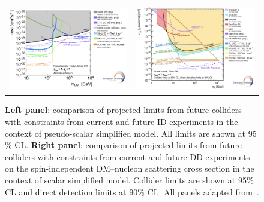\documentclass[11pt]{article}
\begin{document}
\begin{figure}[ht]
\begin{tabular}{ll}
\includegraphics[scale=0.52]{DMsummaryplots_ID.png}
&
\includegraphics[scale=0.49]{DMsummaryplots_DD.png}
\end{tabular}
\caption{{\bf Left panel}: comparison of projected limits from future colliders with constraints from current and future ID experiments in the context of pseudo-scalar simplified model. All limits are shown at 95$\%$ CL. {\bf Right panel}: comparison of projected limits from future colliders with constraints from current and future DD experiments on the spin-independent DM–nucleon scattering cross section in the context of scalar simplified model. Collider limits are shown at 95$\%$ CL and direct detection limits at 90$\%$ CL. All panels adapted from~\cite{Ellis:2691414}.
}
\label{Fig:Fig2}
\end{figure}
\end{document}
